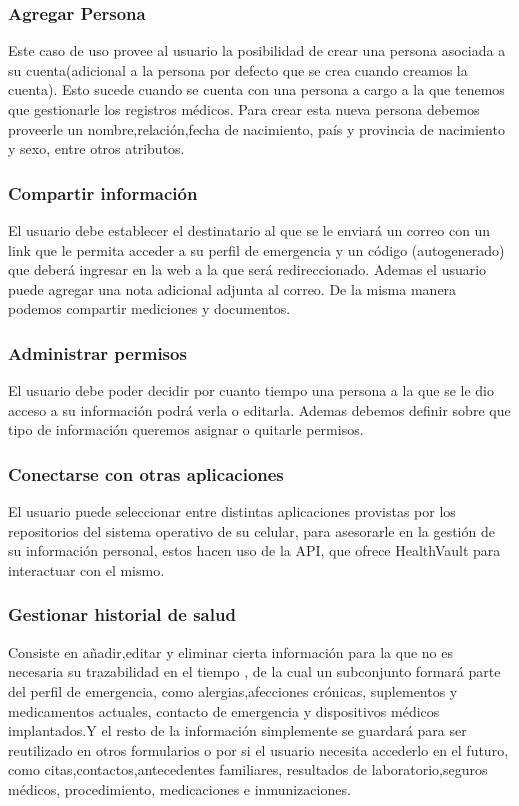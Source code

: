  {\correccionTexto
\subsubsection{Agregar Persona}
Este caso de uso provee al usuario la posibilidad de crear una persona asociada a su cuenta(adicional a la persona por defecto que se crea cuando creamos la cuenta). Esto sucede cuando se cuenta con una persona a cargo a la que tenemos que gestionarle los registros médicos. Para crear esta nueva persona debemos proveerle un nombre,relación,fecha de nacimiento, país y provincia de nacimiento y sexo, entre otros atributos.
 
 \subsubsection{Compartir información}
El usuario debe establecer el destinatario al que se le enviará un correo con un link que le permita acceder a su perfil de emergencia y un código (autogenerado) que deberá ingresar en la web a la que será redireccionado. Ademas el usuario puede agregar una nota adicional adjunta al correo. De la misma manera podemos compartir mediciones y documentos.

\subsubsection{Administrar permisos}
El usuario debe poder decidir por cuanto tiempo una persona a la que se le dio acceso a su información podrá verla o editarla. Ademas debemos definir sobre que tipo de información queremos asignar o quitarle permisos.

\subsubsection{Conectarse con otras aplicaciones}
El usuario puede seleccionar entre distintas aplicaciones provistas por los repositorios del sistema operativo de su celular, para asesorarle en la gestión de su información personal, estos hacen uso de la API, que ofrece HealthVault para interactuar con el mismo.

\subsubsection{Gestionar historial de salud}
Consiste en añadir,editar y eliminar cierta información para la que no es necesaria su trazabilidad en el tiempo , de la cual un subconjunto formará parte del perfil de emergencia, como alergias,afecciones crónicas, suplementos y medicamentos actuales, contacto de emergencia y dispositivos médicos implantados.Y el resto de la información simplemente se guardará para ser reutilizado en otros formularios o por si el usuario necesita accederlo en el futuro, como citas,contactos,antecedentes familiares, resultados de laboratorio,seguros médicos, procedimiento, medicaciones e inmunizaciones.
 
}

